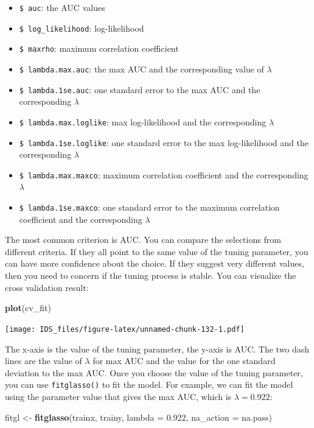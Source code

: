 \documentclass[12pt,]{krantz}
\makeatletter
\newenvironment{Shaded}{\begin{snugshade}}{\end{snugshade}}
\newcommand{\DataTypeTok}[1]{\textcolor[rgb]{0.27,0.27,0.27}{#1}}
\newcommand{\FloatTok}[1]{\textcolor[rgb]{0.06,0.06,0.06}{#1}}
\newcommand{\KeywordTok}[1]{\textcolor[rgb]{0.27,0.27,0.27}{\textbf{#1}}}
\newcommand{\NormalTok}[1]{#1}
\newcommand{\StringTok}[1]{\textcolor[rgb]{0.5,0.5,0.5}{#1}}
\providecommand{\tightlist}{%
  \setlength{\itemsep}{0pt}\setlength{\parskip}{0pt}}
\newenvironment{kframe}{%
\medskip{}
\setlength{\fboxsep}{.8em}
 \def\at@end@of@kframe{}%
 \ifinner\ifhmode%
  \def\at@end@of@kframe{\end{minipage}}%
  \begin{minipage}{\columnwidth}%
 \fi\fi%
 \def\FrameCommand##1{\hskip\@totalleftmargin \hskip-\fboxsep
 \colorbox{shadecolor}{##1}\hskip-\fboxsep
     \hskip-\linewidth \hskip-\@totalleftmargin \hskip\columnwidth}%
 \MakeFramed {\advance\hsize-\width
   \@totalleftmargin\z@ \linewidth\hsize
   \@setminipage}}%
 {\par\unskip\endMakeFramed%
 \at@end@of@kframe}
\renewenvironment{Shaded}{\begin{kframe}}{\end{kframe}}
\makeatother
\begin{document}
\begin{itemize}
\tightlist
\item
  \texttt{\$\ auc}: the AUC values
\item
  \texttt{\$\ log\_likelihood}: log-likelihood
\item
  \texttt{\$\ maxrho}: maximum correlation coefficient
\item
  \texttt{\$\ lambda.max.auc}: the max AUC and the corresponding value of \(\lambda\)
\item
  \texttt{\$\ lambda.1se.auc}: one standard error to the max AUC and the corresponding \(\lambda\)
\item
  \texttt{\$\ lambda.max.loglike}: max log-likelihood and the corresponding \(\lambda\)
\item
  \texttt{\$\ lambda.1se.loglike}: one standard error to the max log-likelihood and the corresponding \(\lambda\)
\item
  \texttt{\$\ lambda.max.maxco}: maximum correlation coefficient and the corresponding \(\lambda\)
\item
  \texttt{\$\ lambda.1se.maxco}: one standard error to the maximum correlation coefficient and the corresponding \(\lambda\)
\end{itemize}

The most common criterion is AUC. You can compare the selections from different criteria. If they all point to the same value of the tuning parameter, you can have more confidence about the choice. If they suggest very different values, then you need to concern if the tuning process is stable. You can visualize the cross validation result:

\begin{Shaded}
\begin{Highlighting}[]
\KeywordTok{plot}\NormalTok{(cv_fit)}
\end{Highlighting}
\end{Shaded}

\texttt{[image: IDS\_files/figure-latex/unnamed-chunk-132-1.pdf]}

The x-axis is the value of the tuning parameter, the y-axis is AUC. The two dash lines are the value of \(\lambda\) for max AUC and the value for the one standard deviation to the max AUC. Once you choose the value of the tuning parameter, you can use \texttt{fitglasso()} to fit the model. For example, we can fit the model using the parameter value that gives the max AUC, which is \(\lambda=0.922\):

\begin{Shaded}
\begin{Highlighting}[]
\NormalTok{fitgl <-}\StringTok{ }\KeywordTok{fitglasso}\NormalTok{(trainx, trainy, }
                   \DataTypeTok{lambda =} \FloatTok{0.922}\NormalTok{, }\DataTypeTok{na_action =}\NormalTok{ na.pass)}
\end{Highlighting}
\end{Shaded}
\end{document}
